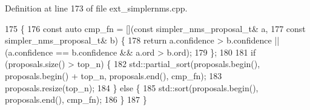 Definition at line 173 of file ext\+\_\+simplernms.\+cpp.


\begin{DoxyCode}
175                       \{
176     \textcolor{keyword}{const} \textcolor{keyword}{auto} cmp\_fn = [](\textcolor{keyword}{const} simpler\_nms\_proposal\_t& a,
177                            \textcolor{keyword}{const} simpler\_nms\_proposal\_t& b) \{
178         \textcolor{keywordflow}{return} a.confidence > b.confidence || (a.confidence == b.confidence && a.ord > b.ord);
179     \};
180 
181     \textcolor{keywordflow}{if} (proposals.size() > top\_n) \{
182         std::partial\_sort(proposals.begin(), proposals.begin() + top\_n, proposals.end(), cmp\_fn);
183         proposals.resize(top\_n);
184     \} \textcolor{keywordflow}{else} \{
185         std::sort(proposals.begin(), proposals.end(), cmp\_fn);
186     \}
187 \}
\end{DoxyCode}
